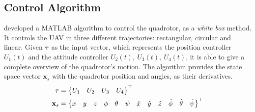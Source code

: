 \subsection{Control Algorithm}

\textcite{geronel2023} developed a MATLAB algorithm to control the quadrotor, as a \emph{white box} method. 
It controls the UAV in three different trajectories: rectangular, circular and linear.
Given \(\mathbf{\tau}\) as the input vector, which represents the position controller \(U_1(t)\) and the attitude controller \(U_2(t),\ U_3(t),\ U_4(t)\), it is able to give a complete overview of the quadrotor's motion.
The algorithm provides the state space vector \(\mathbf{x}_s\) with the quadrotor position and angles, as their derivatives.
%
\begin{align}
    \tau &= \begin{Bmatrix}
        U_1 & U_2 & U_3 & U_4
    \end{Bmatrix}^{\top} \\
    \setcounter{MaxMatrixCols}{13}
    \mathbf{x}_s &=
    \begin{Bmatrix}
        x&y&z&\phi&\theta&\psi&\dot{x}&\dot{y}&\dot{z}&\dot{\phi}&\dot{\theta}&\dot{\psi}
    \end{Bmatrix}^{\top}
    \label{eq:xs_vector_matlab}
\end{align}